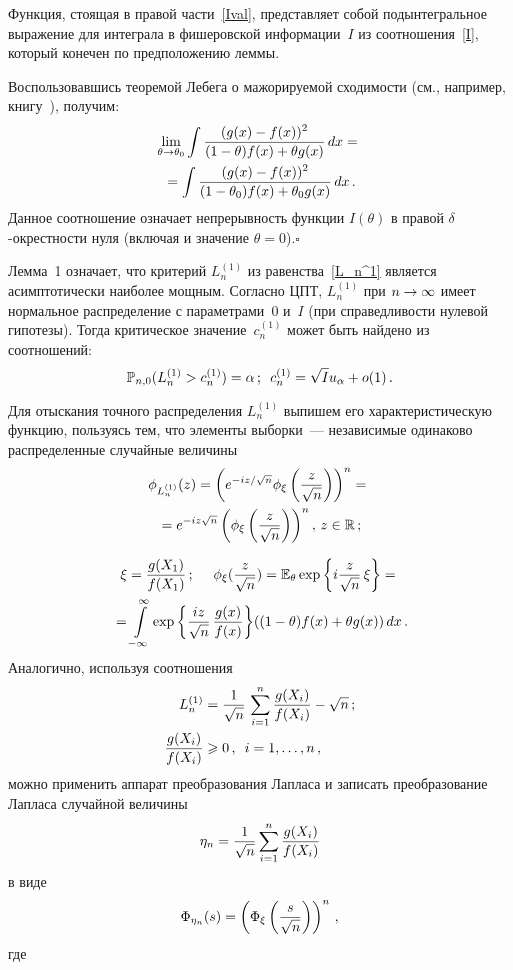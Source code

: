 \begin{multicols}{2}
Функция, стоящая в правой части~\eqref{Ival}, пред\-став\-ля\-ет собой
подынтегральное выражение для интеграла в фишеровской информации~$I$ 
из соотношения~\eqref{I}, который конечен по предположению леммы.

Воспользовавшись теоремой Лебега о мажорируемой сходимости (см.,
например, книгу~\cite{KF1976}), получим:
\begin{multline*}
\lim\limits_{\theta\to\theta_0}\int\fr{(g(x)-f(x))^2}{(1-\theta)
f(x)+\theta
g(x)}\,dx={}\\
{}=\int\fr{(g(x)-f(x))^2}{(1-\theta_0)
f(x)+\theta_0 g(x)}\,dx\,.
\end{multline*}
Данное соотношение означает непрерывность функции $I(\theta)$ в
правой $\delta$-окрест\-ности нуля (включая и значение $\theta=0$).\hfill$\square$

\medskip

Лемма~1 означает, что критерий $L_n^{(1)}$ из
равенства~\eqref{L_n^1} является асимптотически наиболее мощным.
Согласно ЦПТ, $L_n^{(1)}$ при $n\hm\rightarrow\infty$ имеет нормальное
распределение с параметрами~$0$ и~$I$ (при справедливости нулевой
гипотезы). Тогда критическое значение~$c^{(1)}_n$ может быть найдено
из соотношений:
$$
\Pr_{n,0}(L_n^{(1)}>c^{(1)}_n)=\alpha\,;\enskip 
c^{(1)}_n=\sqrt{I}u_\alpha+o(1)\,.
$$

Для отыскания точного распределения $L_n^{(1)}$ выпишем его
характеристическую функцию, пользуясь тем, что элементы выборки~---
независимые одинаково распределенные случайные величины
\begin{multline}
\label{Xf}\phi_{L_n^{(1)}}(z)=\left(e^{-iz/\sqrt{n}}\phi_\xi\left(\fr{z}{\sqrt
n}\right)\right)^n={}\\
{}=e^{-iz\sqrt{n}}\left(\phi_\xi\left(
\fr {z}{\sqrt n}\right)\right)^n,\,z\in\r\,;
\end{multline}

\vspace*{-6pt}

\noindent
\begin{multline*}
\xi=\fr{g(X_1)}{f(X_1)}\,;\ \ \ \ \phi_\xi(\fr {z}{\sqrt
n})=\E_\theta \exp{\left\{i\fr{z}{\sqrt
n}\,\xi\right\}}={}\\
{}=\int\limits_{-\infty}^\infty\exp{\left\{\fr {iz}{\sqrt
n}\,\fr{g(x)}{f(x)}\right\}}((1-\theta) f(x)+\theta
 g(x))\,dx\,.
\end{multline*}
Аналогично, используя соотношения
\begin{align*}
L_n^{(1)}&=\fr{1}{\sqrt{n}}\,\sum_{i=1}^n\fr{g(X_i)}{f(X_i)}-\sqrt{n}\,;
\\
\fr{g(X_i)}{f(X_i)}&\geqslant 0\,,\enskip  i=1,\ldots,n\,,
\end{align*}
можно применить аппарат преобразования Лапласа и записать
преобразование Лапласа случайной величины
$$
\eta_n=\fr{1}{\sqrt{n}}\sum_{i=1}^n\fr{g(X_i)}{f(X_i)}
$$
в виде
$$
\Phi_{\eta_n}(s)=\left(\Phi_\xi\left(\fr {s}{\sqrt
n}\right)\right)^n\,,
$$
где


\end{multicols}
